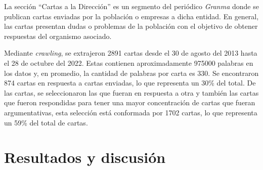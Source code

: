 \documentclass{rcci} %
\begin{document}
La secci\'on ``Cartas a la Direcci\'on'' \cite{gallego2013cartas} es un segmento del peri\'odico \textit{Granma} donde se publican
cartas enviadas por la poblaci\'on o empresas a dicha entidad. En general, las cartas 
presentan dudas o problemas de la poblaci\'on con el objetivo de obtener respuestas del organismo
asociado. 

Mediante \textit{crawling}, se extrajeron 2891 cartas desde el 30 de agosto del 2013 hasta el 28 de octubre del 2022. Estas 
contienen aproximadamente 975000 palabras en los datos y, en promedio, la cantidad de palabras por carta es 330.
Se encontraron 874 cartas en respuesta a cartas enviadas, lo que representa un 30\% del total. 
De las cartas, se seleccionaron las que fueran en respuesta a otra y tambi\'en las 
cartas que fueron respondidas para tener una mayor concentraci\'on de cartas que fueran argumentativas, 
esta selecci\'on est\'a conformada por 1702 cartas, lo que representa un 59\% del total de cartas.

\section*{Resultados y discusi\'on}




\end{document}
